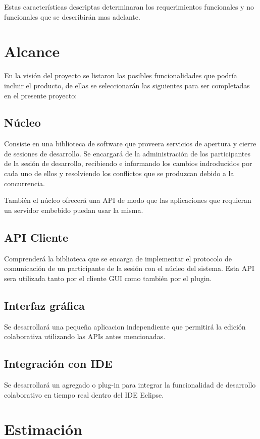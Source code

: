 \documentclass[12pt,a4paper]{article}
\begin{document}
Estas características descriptas determinaran los requerimientos funcionales y no funcionales que se describirán mas adelante.

	\section{Alcance}
   En la visión del proyecto se listaron las posibles funcionalidades que podría incluir el producto, de ellas se seleccionarán las siguientes para ser completadas en el presente proyecto:
   
	\subsection{Núcleo}
	Consiste en una biblioteca de software que proveera servicios de apertura y cierre de sesiones de desarrollo. Se encargará de la administración de los participantes de la sesión de desarrollo, recibiendo e informando los cambios indroducidos por cada uno de ellos y resolviendo los conflictos que se produzcan debido a la concurrencia.
	
	También el núcleo ofrecerá una API de modo que las aplicaciones que requieran un servidor embebido puedan usar la misma.

	\subsection{API Cliente}
	Comprenderá la biblioteca que se encarga de implementar el protocolo de comunicación de un participante de la sesión con el núcleo del sistema. Esta API sera utilizada tanto por el cliente GUI como también por el plugin.

	\subsection{Interfaz gráfica}
	Se desarrollará una pequeña aplicacion independiente que permitirá la edición colaborativa utilizando las APIs antes mencionadas.

	\subsection{Integración con IDE}
	Se desarrollará un agregado o plug-in para integrar la funcionalidad de desarrollo colaborativo en tiempo real dentro del IDE Eclipse.

	\section{Estimación}
\end{document}
